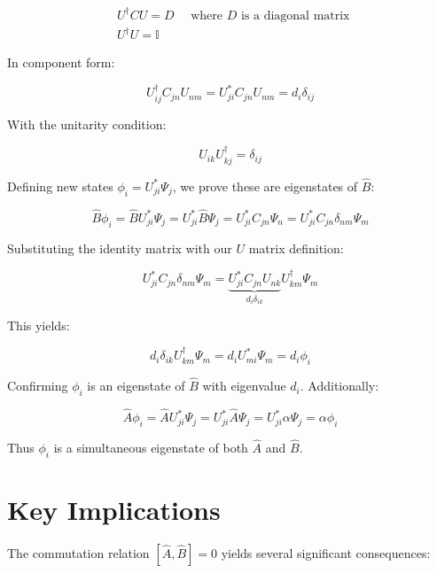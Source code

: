 \begin{align}
& U^{\dagger} C U=D \quad \text { where } D \text { is a diagonal matrix } \\
& U^{\dagger} U=\mathbb{I}
\end{align}

In component form:

\begin{equation}
U_{i j}^{\dagger} C_{j n} U_{n m}=U_{j i}^{*} C_{j n} U_{n m}=d_{i} \delta_{i j}
\end{equation}

With the unitarity condition:

\begin{equation}
U_{i k} U_{k j}^{\dagger}=\delta_{i j}
\end{equation}

Defining new states $\phi_{i}=U_{j i}^{*} \Psi_{j}$, we prove these are eigenstates of $\hat{B}$:

\begin{equation}
\hat{B} \phi_{i}=\hat{B} U_{j i}^{*} \Psi_{j}=U_{j i}^{*} \hat{B} \Psi_{j}=U_{j i}^{*} C_{j n} \Psi_{n}=U_{j i}^{*} C_{j n} \delta_{n m} \Psi_{m}
\end{equation}

Substituting the identity matrix with our $U$ matrix definition:

\begin{equation}
U_{j i}^{*} C_{j n} \delta_{n m} \Psi_{m}=\underbrace{U_{j i}^{*} C_{j n} U_{n k}}_{d_{i} \delta_{i k}} U_{k m}^{\dagger} \Psi_{m}
\end{equation}

This yields:

\begin{equation}
d_{i} \delta_{i k} U_{k m}^{\dagger} \Psi_{m}=d_{i} U_{m i}^{*} \Psi_{m}=d_{i} \phi_{i}
\end{equation}

Confirming $\phi_{i}$ is an eigenstate of $\hat{B}$ with eigenvalue $d_i$. Additionally:

\begin{equation}
\hat{A} \phi_{i}=\hat{A} U_{j i}^{*} \Psi_{j}=U_{j i}^{*} \hat{A} \Psi_{j}=U_{j i}^{*} \alpha \Psi_{j}=\alpha \phi_{i}
\end{equation}

Thus $\phi_{i}$ is a simultaneous eigenstate of both $\hat{A}$ and $\hat{B}$.

\section{Key Implications}
The commutation relation $[\hat{A}, \hat{B}]=0$ yields several significant consequences:

